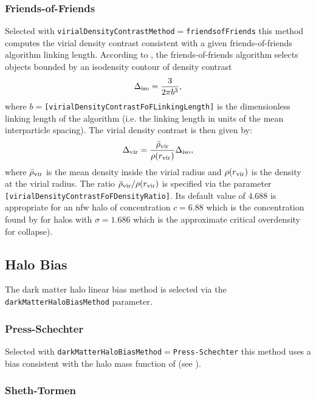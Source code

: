 \subsubsection{Friends-of-Friends}

Selected with {\tt virialDensityContrastMethod}$=${\tt friendsofFriends} this method computes the virial density contrast consistent with a given friends-of-friends algorithm linking length. According to \cite{lacey_merger_1994}, the friends-of-friends algorithm selects objects bounded by an isodensity contour of density contrast
\begin{equation}
\Delta_{\rm iso} = {3 \over 2 \pi b^3},
\end{equation}
where $b=${\tt [virialDensityContrastFoFLinkingLength]} is the dimensionless linking length of the algorithm (i.e. the linking length in units of the mean interparticle spacing). The virial density contrast is then given by:
\begin{equation}
\Delta_{\rm vir} = {\bar{\rho}_{\rm vir} \over \rho(r_{\rm vir})} \Delta_{\rm iso},
\end{equation}
where $\bar{\rho}_{\rm vir}$ is the mean density inside the virial radius and $\rho(r_{\rm vir})$ is the density at the virial radius. The ratio $\bar{\rho}_{\rm vir} / \rho(r_{\rm vir})$ is specified via the parameter {\tt [virialDensityContrastFoFDensityRatio]}. Its default value of $4.688$ is appropriate for an \gls{nfw} halo of concentration $c=6.88$ which is the concentration found by \cite{prada_halo_2011} for halos with $\sigma=1.686$ which is the approximate critical overdensity for collapse).

\subsection{Halo Bias}

The dark matter halo linear bias method is selected via the {\tt darkMatterHaloBiasMethod} parameter.

\subsubsection{Press-Schechter}

Selected with {\tt darkMatterHaloBiasMethod}$=${\tt Press-Schechter} this method uses a bias consistent with the halo mass function of \cite{press_formation_1974} (see \citep{mo_analytic_1996}).

\subsubsection{Sheth-Tormen}

